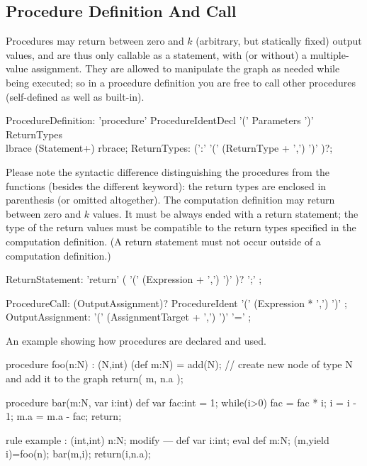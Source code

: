 \subsection{Procedure Definition And Call}\label{sub:procedures}\label{sec:proccall} 

Procedures may return between zero and $k$ (arbitrary, but statically fixed) output values, and are thus only callable as a statement, with (or without) a multiple-value assignment.
They are allowed to manipulate the graph as needed while being executed;
so in a procedure definition you are free to call other procedures (self-defined as well as built-in).

\begin{rail} 
  ProcedureDefinition: 
	'procedure' ProcedureIdentDecl '(' Parameters ')' ReturnTypes \\
	lbrace (Statement+) rbrace;
  ReturnTypes: (':' '(' (ReturnType + ',') ')' )?;
\end{rail}

Please note the syntactic difference distinguishing the procedures from the functions (besides the different keyword): the return types are enclosed in parenthesis (or omitted altogether).
The computation definition may return between zero and $k$ values.
It must be always ended with a return statement; the type of the return values must be compatible to the return types specified in the computation definition.
(A return statement must not occur outside of a computation definition.)

\begin{rail}
  ReturnStatement: 'return' ( '(' (Expression + ',') ')' )? ';' ;
\end{rail}

\begin{rail}
  ProcedureCall: (OutputAssignment)? ProcedureIdent '(' (Expression * ',') ')' ;
  OutputAssignment: '(' (AssignmentTarget + ',') ')' '=' ;
\end{rail}

\begin{example}
An example showing how procedures are declared and used.
  \begin{grgen}
procedure foo(n:N) : (N,int)
{
	(def m:N) = add(N); // create new node of type N and add it to the graph
	return( m, n.a );
}

procedure bar(m:N, var i:int)
{
	def var fac:int = 1;
	while(i>0) {
		fac = fac * i;
		i = i - 1;
	}
	m.a = m.a - fac;
	return;
}

rule example : (int,int)
{
	n:N;
	modify {
	---
		def var i:int;
		eval {
			def m:N;
			(m,yield i)=foo(n);
			bar(m,i);
		}
		return(i,n.a);
	}
}
  \end{grgen}
\end{example}


